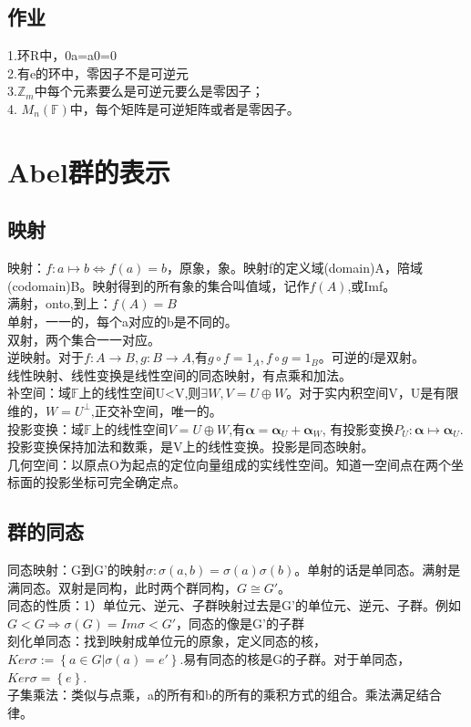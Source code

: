 \documentclass[UTF8]{article}
\begin{document}
\subsection{作业}
1.环R中，0a=a0=0 \\
2.有e的环中，零因子不是可逆元\\
3.$\mathbb Z_m$中每个元素要么是可逆元要么是零因子；\\
4. $M_n(\mathbb F)$中，每个矩阵是可逆矩阵或者是零因子。

\section{Abel群的表示}
\subsection{映射}
映射：$f:a \mapsto b \Leftrightarrow f(a)=b$，原象，象。映射f的定义域(domain)A，陪域(codomain)B。映射得到的所有象的集合叫值域，记作$f(A)$,或Imf。\\
满射，onto,到上：$f(A)=B$\\
单射，一一的，每个a对应的b是不同的。\\
双射，两个集合一一对应。\\
逆映射。对于$f:A \to B, g: B \to A$,有$g \circ f =1_A, f \circ g =1_B$。可逆的f是双射。\\

线性映射、线性变换是线性空间的同态映射，有点乘和加法。\\
补空间：域$\mathbb F$上的线性空间U<V,则$\exists W, V=U \oplus W$。对于实内积空间V，U是有限维的，$W=U^{\perp}$,正交补空间，唯一的。\\
投影变换：域$\mathbb F$上的线性空间$V=U \oplus W$,有$\mathbf \alpha =\mathbf \alpha _U+\mathbf \alpha _W$, 有投影变换$P_U:\mathbf \alpha \mapsto \mathbf \alpha _U$.投影变换保持加法和数乘，是V上的线性变换。投影是同态映射。\\
几何空间：以原点O为起点的定位向量组成的实线性空间。知道一空间点在两个坐标面的投影坐标可完全确定点。

\subsection{群的同态}
同态映射：G到G'的映射$\sigma: \sigma(a,b)=\sigma(a) \sigma(b)$。单射的话是单同态。满射是满同态。双射是同构，此时两个群同构，$G \cong G'$。\\
同态的性质：1）单位元、逆元、子群映射过去是G’的单位元、逆元、子群。例如$G<G \Rightarrow \sigma(G)=Im\sigma <G'$，同态的像是G'的子群\\
刻化单同态：找到映射成单位元的原象，定义同态的核，$Ker\sigma:=\left\{ a \in G | \sigma(a)=e' \right\}$.易有同态的核是G的子群。对于单同态，$Ker\sigma=\left\{ e \right\}$.\\
子集乘法：类似与点乘，a的所有和b的所有的乘积方式的组合。乘法满足结合律。\\
\end{document}
